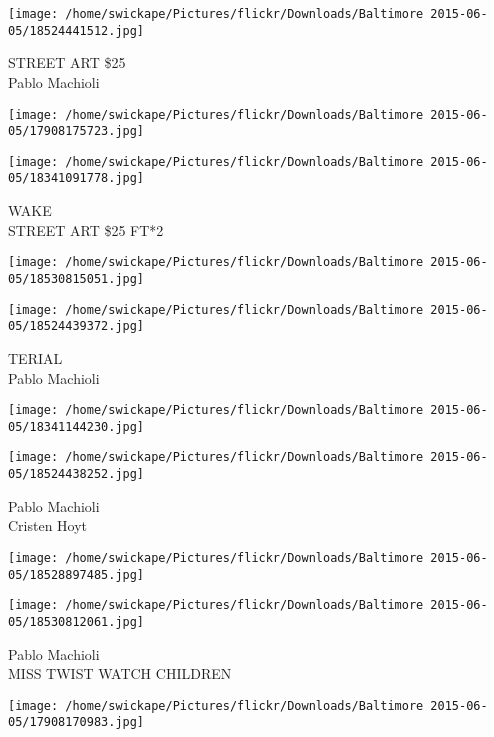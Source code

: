 \documentclass[10pt,letterpaper]{article}
\begin{document}
\vspace{0.25in}
\texttt{[image: /home/swickape/Pictures/flickr/Downloads/Baltimore 2015-06-05/18524441512.jpg]}

STREET ART \$25\\
Pablo Machioli\\
\pagebreak

\texttt{[image: /home/swickape/Pictures/flickr/Downloads/Baltimore 2015-06-05/17908175723.jpg]}

\vspace{0.25in}
\texttt{[image: /home/swickape/Pictures/flickr/Downloads/Baltimore 2015-06-05/18341091778.jpg]}

WAKE\\
STREET ART \$25 FT*2\\
\pagebreak

\texttt{[image: /home/swickape/Pictures/flickr/Downloads/Baltimore 2015-06-05/18530815051.jpg]}

\vspace{0.25in}
\texttt{[image: /home/swickape/Pictures/flickr/Downloads/Baltimore 2015-06-05/18524439372.jpg]}

TERIAL\\
Pablo Machioli\\
\pagebreak

\texttt{[image: /home/swickape/Pictures/flickr/Downloads/Baltimore 2015-06-05/18341144230.jpg]}

\vspace{0.25in}
\texttt{[image: /home/swickape/Pictures/flickr/Downloads/Baltimore 2015-06-05/18524438252.jpg]}

Pablo Machioli\\
Cristen Hoyt\\
\pagebreak

\texttt{[image: /home/swickape/Pictures/flickr/Downloads/Baltimore 2015-06-05/18528897485.jpg]}

\vspace{0.25in}
\texttt{[image: /home/swickape/Pictures/flickr/Downloads/Baltimore 2015-06-05/18530812061.jpg]}

Pablo Machioli\\
MISS TWIST WATCH CHILDREN\\
\pagebreak

\texttt{[image: /home/swickape/Pictures/flickr/Downloads/Baltimore 2015-06-05/17908170983.jpg]}
\end{document}
